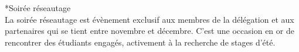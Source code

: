 *Soirée réseautage\\
La soirée réseautage est évènement exclusif aux membres de la délégation et aux partenaires qui se tient entre novembre et décembre. C'est une occasion en or de rencontrer des étudiants engagés, activement à la recherche de stages d'été.